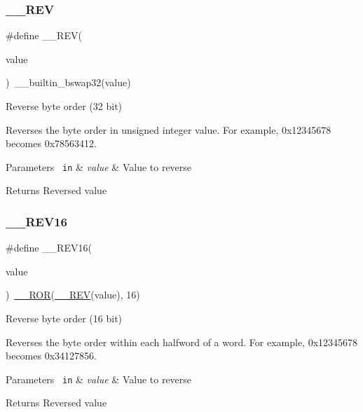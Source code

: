 \subsubsection{\texorpdfstring{\_\_REV}{\_\_REV}\hspace{0.1cm}{\footnotesize\ttfamily [2/2]}}
{\footnotesize\ttfamily \#define \+\_\+\+\_\+\+R\+EV(\begin{DoxyParamCaption}\item[{}]{value }\end{DoxyParamCaption})~\+\_\+\+\_\+builtin\+\_\+bswap32(value)}



Reverse byte order (32 bit) 

Reverses the byte order in unsigned integer value. For example, 0x12345678 becomes 0x78563412. 
\begin{DoxyParams}[1]{Parameters}
\mbox{\texttt{ in}}  & {\em value} & Value to reverse \\
\hline
\end{DoxyParams}
\begin{DoxyReturn}{Returns}
Reversed value 
\end{DoxyReturn}
\mbox{\label{group___c_m_s_i_s___core___instruction_interface_gad35497777af37e7809271b5e6f9510ba}} 
\subsubsection{\texorpdfstring{\_\_REV16}{\_\_REV16}}
{\footnotesize\ttfamily \#define \+\_\+\+\_\+\+R\+E\+V16(\begin{DoxyParamCaption}\item[{}]{value }\end{DoxyParamCaption})~\mbox{\hyperlink{group___c_m_s_i_s___core___instruction_interface_gab16acb6456176f1e87a4f2724c2b6028}{\+\_\+\+\_\+\+R\+OR}}(\mbox{\hyperlink{group___c_m_s_i_s___core___instruction_interface_gadb92679719950635fba8b1b954072695}{\+\_\+\+\_\+\+R\+EV}}(value), 16)}



Reverse byte order (16 bit) 

Reverses the byte order within each halfword of a word. For example, 0x12345678 becomes 0x34127856. 
\begin{DoxyParams}[1]{Parameters}
\mbox{\texttt{ in}}  & {\em value} & Value to reverse \\
\hline
\end{DoxyParams}
\begin{DoxyReturn}{Returns}
Reversed value 
\end{DoxyReturn}
\mbox{\label{group___c_m_s_i_s___core___instruction_interface_gae580812686119c9c5cf3c11a7519a404}} 
